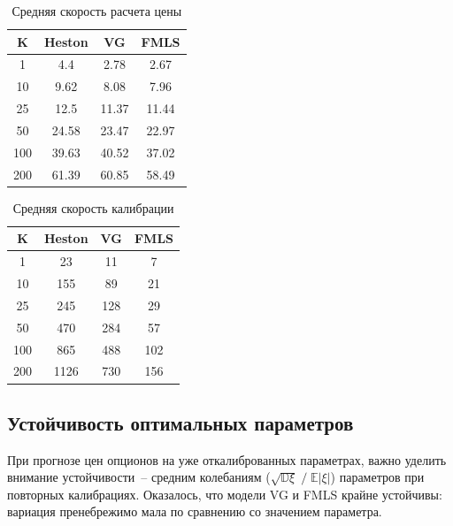 \documentclass[oneside, final, 12pt]{article}
\begin{document}
\begin{table}[h!]
  \begin{center}
    \caption{Средняя скорость расчета цены}
    \label{tab:table1}
    \begin{tabular}{c|c|c|c}
      \textbf{K} & \textbf{Heston} & \textbf{VG} & \textbf{FMLS}\\
      \hline
      1   & 4.4 & 2.78 & 2.67\\
      10  & 9.62 & 8.08 & 7.96\\
      25  & 12.5 & 11.37 & 11.44\\
      50  & 24.58 & 23.47 & 22.97\\
      100 & 39.63 & 40.52 & 37.02\\
      200 & 61.39 & 60.85 & 58.49\\
    \end{tabular}
  \end{center}
\end{table}

\begin{table}[h!]
  \begin{center}
    \caption{Средняя скорость калибрации}
    \label{tab:table2}
    \begin{tabular}{c|c|c|c}
      \textbf{K} & \textbf{Heston} & \textbf{VG} & \textbf{FMLS}\\
      \hline
      1   & 23 & 11 & 7 \\
      10  & 155 & 89 & 21\\
      25  & 245 & 128 & 29\\
      50  & 470 & 284 & 57\\
      100 & 865 & 488 & 102\\
      200 & 1126 & 730 & 156\\
    \end{tabular}
  \end{center}
\end{table}


\subsection{Устойчивость оптимальных параметров}
При прогнозе цен опционов на уже откалиброванных параметрах, важно уделить внимание устойчивости~-- средним колебаниям ($ \sqrt{\mathbb{D}\xi}\;/\;\mathbb{E}|\xi| $) параметров при повторных калибрациях. Оказалось, что модели VG и FMLS крайне устойчивы: вариация пренебрежимо мала по сравнению со значением параметра.
\end{document}
